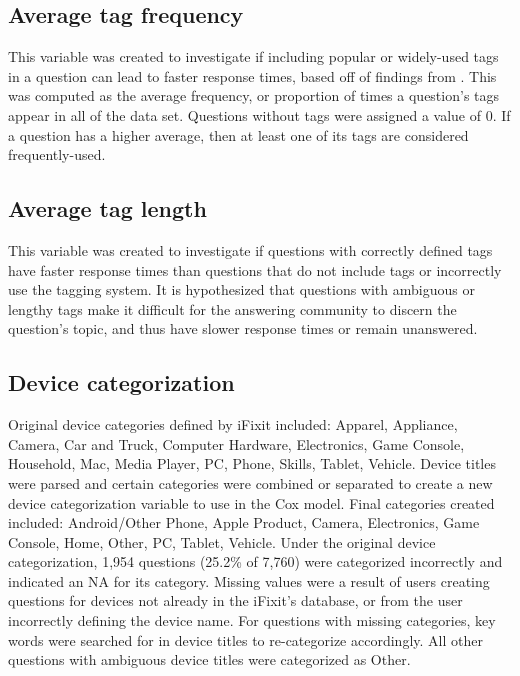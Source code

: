 \documentclass[]{interact}\usepackage[]{graphicx}\usepackage[]{color}
\begin{document}
\subsection{Average tag frequency}

This variable was created to investigate if including popular or widely-used tags in a question can lead to faster response times, based off of findings from \cite{Bhat2014}. This was computed as the average frequency, or proportion of times a question's tags appear in all of the data set. Questions without tags were assigned a value of 0.  If a question has a higher average, then at least one of its tags are considered frequently-used.


\subsection{Average tag length}

This variable was created to investigate if questions with correctly defined tags have faster response times than questions that do not include tags or incorrectly use the tagging system. It is hypothesized that questions with ambiguous or lengthy tags make it difficult for the answering community to discern the question's topic, and thus have slower response times or remain unanswered. 


\subsection{Device categorization}

Original device categories defined by iFixit included: Apparel, Appliance, Camera, Car and Truck, Computer Hardware, Electronics, Game Console, Household, Mac, Media Player, PC, Phone, Skills, Tablet, Vehicle. Device titles were parsed and certain categories were combined or separated to create a new device categorization variable to use in the Cox model. Final categories created included: Android/Other Phone, Apple Product, Camera, Electronics, Game Console, Home, Other, PC, Tablet, Vehicle. Under the original device categorization, 1,954 questions (25.2\% of 7,760) were categorized incorrectly and indicated an NA for its category. Missing values were a result of users creating questions for devices not already in the iFixit's database, or from the user incorrectly defining the device name. For questions with missing categories, key words were searched for in device titles to re-categorize accordingly. All other questions with ambiguous device titles were categorized as Other. 
\end{document}
